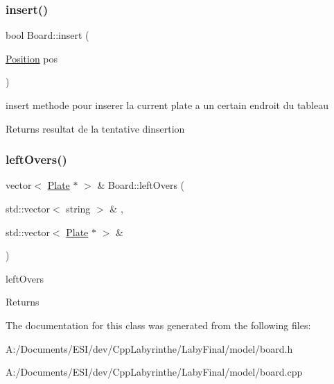 \subsubsection{\texorpdfstring{insert()}{insert()}}
{\footnotesize\ttfamily bool Board\+::insert (\begin{DoxyParamCaption}\item[{\mbox{\hyperlink{class_position}{Position}}}]{pos }\end{DoxyParamCaption})}



insert methode pour inserer la current plate a un certain endroit du tableau 

\begin{DoxyReturn}{Returns}
resultat de la tentative d\textquotesingle{}insertion 
\end{DoxyReturn}
\mbox{\label{class_board_a3164f6e33a9c5a7a02d899407ef8a3d1}} 
\subsubsection{\texorpdfstring{leftOvers()}{leftOvers()}}
{\footnotesize\ttfamily vector$<$ \mbox{\hyperlink{class_plate}{Plate}} $\ast$ $>$ \& Board\+::left\+Overs (\begin{DoxyParamCaption}\item[{std\+::vector$<$ string $>$ \&}]{,  }\item[{std\+::vector$<$ \mbox{\hyperlink{class_plate}{Plate}} $\ast$ $>$ \&}]{ }\end{DoxyParamCaption})\hspace{0.3cm}{\ttfamily [private]}}



left\+Overs 

\begin{DoxyReturn}{Returns}

\end{DoxyReturn}


The documentation for this class was generated from the following files\+:\begin{DoxyCompactItemize}
\item 
A\+:/\+Documents/\+E\+S\+I/dev/\+Cpp\+Labyrinthe/\+Laby\+Final/model/board.\+h\item 
A\+:/\+Documents/\+E\+S\+I/dev/\+Cpp\+Labyrinthe/\+Laby\+Final/model/board.\+cpp\end{DoxyCompactItemize}

